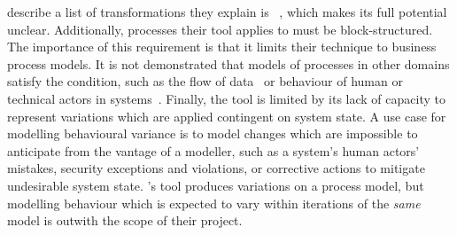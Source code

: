 \citeauthor{pourmasoumi2015business} describe a list of transformations  they
explain is ~\cite{pourmasoumi2015business}, which makes its full potential
unclear. Additionally, processes their tool applies to must be block-structured.
The importance of this requirement is that it limits their technique  to business
process models. It is not demonstrated that models of processes in other domains
satisfy the condition, such as the flow of data~\cite{obashimethodology} or
behaviour of human or technical actors in \sociotechnical
systems~\cite{wallis2018caise}. Finally, the tool is limited by its lack of
capacity to represent variations which are applied contingent on system state. A
use case for modelling behavioural variance is to model changes which are
impossible to anticipate from the vantage of a modeller, such as a
\sociotechnical system's human actors' mistakes, security exceptions and
violations, or corrective actions to mitigate undesirable system state.
\citeauthor{pourmasoumi2015business}'s tool produces variations on a process
model, but modelling behaviour which is expected to vary within iterations of
the \emph{same} model is outwith the scope of their project.




